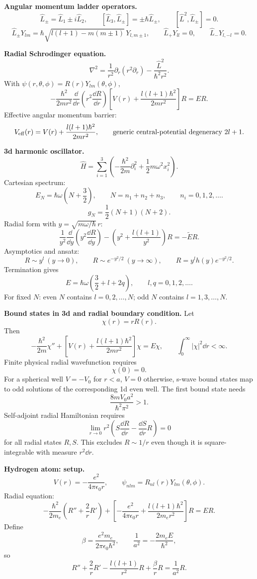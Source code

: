 \noindent\textbf{Angular momentum ladder operators.}
\[
\hat L_\pm=\hat L_1\pm i\hat L_2,\qquad
[\hat L_3,\hat L_\pm]=\pm\hbar\hat L_\pm,\qquad
[\hat L^2,\hat L_\pm]=0.
\]
\[
\hat L_\pm Y_{lm}
=\hbar\sqrt{l(l+1)-m(m\pm1)}\,Y_{l,m\pm1},\qquad
\hat L_+Y_{ll}=0,\qquad
\hat L_-Y_{l,-l}=0.
\]

\noindent\textbf{Radial Schrodinger equation.}
\[
\nabla^2=\frac{1}{r^2}\partial_r(r^2\partial_r)-\frac{\hat L^2}{\hbar^2r^2}.
\]
With \(\psi(r,\theta,\phi)=R(r)Y_{lm}(\theta,\phi)\),
\[
\boxed{
-\frac{\hbar^2}{2mr^2}\frac{\dd}{\dd r}
\left(r^2\frac{\dd R}{\dd r}\right)
\left[V(r)+\frac{l(l+1)\hbar^2}{2mr^2}\right]R=ER
}.
\]
Effective angular momentum barrier:
\[
V_{\rm eff}(r)=V(r)+\frac{l(l+1)\hbar^2}{2mr^2},\qquad
\text{generic central-potential degeneracy }2l+1.
\]

\noindent\textbf{3d harmonic oscillator.}
\[
\hat H=\sum_{i=1}^3\left(-\frac{\hbar^2}{2m}\partial_i^2
+\frac{1}{2}m\omega^2x_i^2\right).
\]
Cartesian spectrum:
\[
\boxed{E_N=\hbar\omega\left(N+\frac{3}{2}\right)},\qquad
N=n_1+n_2+n_3,\qquad n_i=0,1,2,\ldots .
\]
\[
g_N=\frac{1}{2}(N+1)(N+2).
\]
Radial form with \(y=\sqrt{m\omega/\hbar}\,r\):
\[
\frac{1}{y^2}\frac{\dd}{\dd y}
\left(y^2\frac{\dd R}{\dd y}\right)
-\left(y^2+\frac{l(l+1)}{y^2}\right)R=-\widetilde E R.
\]
Asymptotics and ansatz:
\[
R\sim y^l\ (y\to0),\qquad R\sim e^{-y^2/2}\ (y\to\infty),\qquad
R=y^l h(y)e^{-y^2/2}.
\]
Termination gives
\[
\boxed{E=\hbar\omega\left(\frac{3}{2}+l+2q\right)},\qquad
l,q=0,1,2,\ldots .
\]
For fixed \(N\): even \(N\) contains \(l=0,2,\ldots,N\); odd \(N\) contains
\(l=1,3,\ldots,N\).

\noindent\textbf{Bound states in 3d and radial boundary condition.}
Let
\[
\chi(r)=rR(r).
\]
Then
\[
-\frac{\hbar^2}{2m}\chi''+
\left[V(r)+\frac{l(l+1)\hbar^2}{2mr^2}\right]\chi=E\chi,
\qquad
\int_0^\infty|\chi|^2\dd r<\infty.
\]
Finite physical radial wavefunction requires
\[
\boxed{\chi(0)=0}.
\]
For a spherical well \(V=-V_0\) for \(r<a\), \(V=0\) otherwise, s-wave bound
states map to odd solutions of the corresponding 1d even well. The first bound
state needs
\[
\frac{8mV_0a^2}{\hbar^2\pi^2}>1.
\]
Self-adjoint radial Hamiltonian requires
\[
\lim_{r\to0}r^2\left(S\frac{\dd R}{\dd r}
-\frac{\dd S}{\dd r}R\right)=0
\]
for all radial states \(R,S\). This excludes \(R\sim1/r\) even though it is
square-integrable with measure \(r^2\dd r\).

\noindent\textbf{Hydrogen atom: setup.}
\[
V(r)=-\frac{e^2}{4\pi\epsilon_0r},\qquad
\psi_{nlm}=R_{nl}(r)Y_{lm}(\theta,\phi).
\]
Radial equation:
\[
-\frac{\hbar^2}{2m_e}\left(R''+\frac{2}{r}R'\right)
+\left[-\frac{e^2}{4\pi\epsilon_0r}
+\frac{l(l+1)\hbar^2}{2m_er^2}\right]R=ER.
\]
Define
\[
\beta=\frac{e^2m_e}{2\pi\epsilon_0\hbar^2},\qquad
\frac{1}{a^2}=-\frac{2m_eE}{\hbar^2},
\]
so
\[
R''+\frac{2}{r}R'-\frac{l(l+1)}{r^2}R+\frac{\beta}{r}R=\frac{1}{a^2}R.
\]

